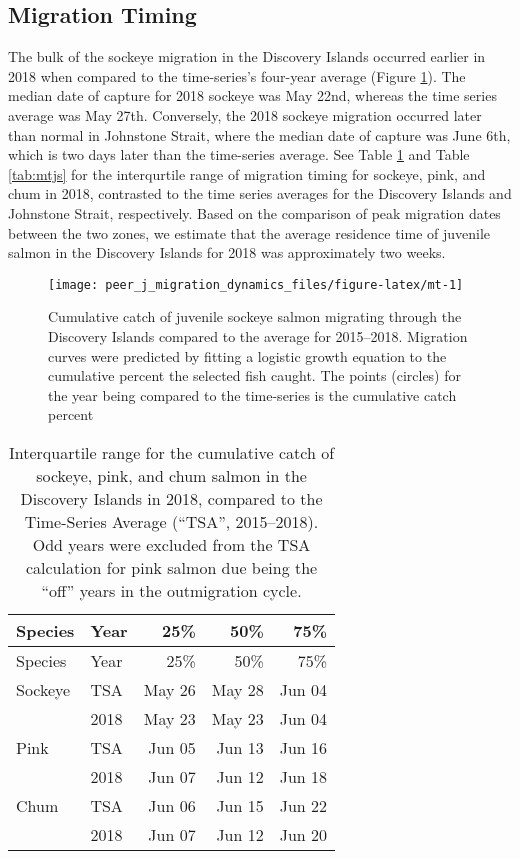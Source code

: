 \documentclass[fleqn,10pt]{wlpeerj} %
\begin{document}
\subsection*{Migration Timing}\label{migration-timing}

The bulk of the sockeye migration in the Discovery Islands occurred
earlier in 2018 when compared to the time-series's four-year average
(Figure \ref{fig:mt}). The median date of capture for 2018 sockeye was
May 22nd, whereas the time series average was May 27th. Conversely, the
2018 sockeye migration occurred later than normal in Johnstone Strait,
where the median date of capture was June 6th, which is two days later
than the time-series average. See Table \ref{tab:mtdi} and Table
\ref{tab:mtjs} for the interqurtile range of migration timing for
sockeye, pink, and chum in 2018, contrasted to the time series averages
for the Discovery Islands and Johnstone Strait, respectively. Based on
the comparison of peak migration dates between the two zones, we
estimate that the average residence time of juvenile salmon in the
Discovery Islands for 2018 was approximately two weeks.

\begin{figure}[H]
\texttt{[image: peer\_j\_migration\_dynamics\_files/figure-latex/mt-1]} \caption{Cumulative catch of juvenile sockeye salmon migrating through the Discovery Islands compared to the average for 2015--2018. Migration curves were predicted by fitting a logistic growth equation to the cumulative percent the selected fish caught. The points (circles) for the year being compared to the time-series is the cumulative catch percent}\label{fig:mt}
\end{figure}

\begin{longtable}[]{@{}llrrr@{}}
\caption{\label{tab:mtdi} Interquartile range for the cumulative catch of
sockeye, pink, and chum salmon in the Discovery Islands in 2018,
compared to the Time-Series Average (``TSA'', 2015--2018). Odd years
were excluded from the TSA calculation for pink salmon due being the
``off'' years in the outmigration cycle.}\tabularnewline
\toprule
Species & Year & 25\% & 50\% & 75\%\tabularnewline
\midrule
\endfirsthead
\toprule
Species & Year & 25\% & 50\% & 75\%\tabularnewline
\midrule
\endhead
Sockeye & TSA & May 26 & May 28 & Jun 04\tabularnewline
~ & 2018 & May 23 & May 23 & Jun 04\tabularnewline
Pink & TSA & Jun 05 & Jun 13 & Jun 16\tabularnewline
~ & 2018 & Jun 07 & Jun 12 & Jun 18\tabularnewline
Chum & TSA & Jun 06 & Jun 15 & Jun 22\tabularnewline
~ & 2018 & Jun 07 & Jun 12 & Jun 20\tabularnewline
\bottomrule
\end{longtable}
\end{document}

